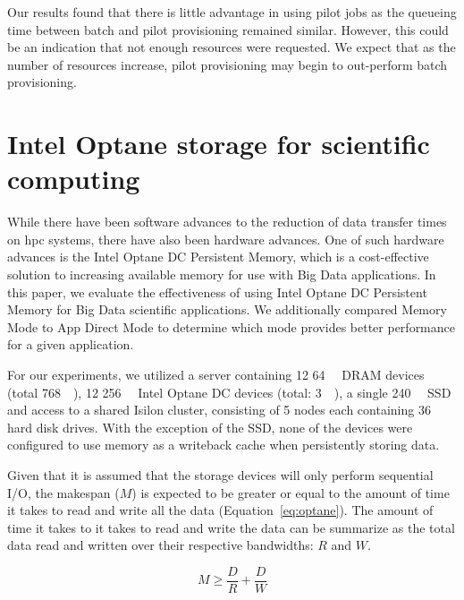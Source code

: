 \documentclass{report}
\begin{document}
        Our results found that there is little advantage in using pilot 
        jobs as the queueing time between batch and pilot provisioning 
        remained similar. However, this could be an indication that not enough 
        resources were requested. We expect that  as the number of resources 
        increase, pilot provisioning may begin to out-perform batch provisioning.

        \section{Intel Optane storage for scientific computing}\label{section:ccgrid2020}


        While there have been software advances to the reduction of data transfer times
        on \gls{hpc} systems, there have also been hardware advances. One of such 
        hardware advances is the Intel Optane DC Persistent Memory, which is a 
        cost-effective solution to increasing available memory for use with Big Data
        applications. In this paper, we evaluate the effectiveness of using
        Intel Optane DC Persistent Memory for Big Data scientific applications.
        We additionally compared Memory Mode to App Direct Mode to determine which
        mode provides better performance for a given application.
        
        For our experiments, we utilized a server containing 12 \SI{64}{\giga\byte} 
        DRAM devices (total
        \SI{768}{\giga\byte}), 12 \SI{256}{\giga\byte} Intel Optane DC devices (total:
        \SI{3}{\tera\byte}), a single \SI{240}{\giga\byte} SSD and access to
        a shared Isilon cluster, consisting of 5 nodes each containing 36 hard disk drives.
        With the exception of the SSD, none of the devices were configured to use memory
        as a writeback cache when persistently storing data.


        Given that it is assumed that the storage devices will only perform sequential
        I/O, the makespan ($M$) is expected to be greater or equal to the amount of time it
        takes to read and write all the data (Equation~\ref{eq:optane}).
        The amount of time it takes to  
        it takes to read and write the data can be summarize as the total data read
        and written over their respective bandwidths: $R$ and $W$.

        \begin{equation}\label{eq:optane}
            M \ge \frac{D}{R} + \frac{D}{W}
        \end{equation}
\end{document}
